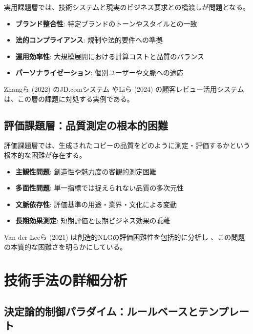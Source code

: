 \documentclass[11pt, a4paper]{article}
\begin{document}
実用課題層では、技術システムと現実のビジネス要求との橋渡しが問題となる。

\begin{itemize}[noitemsep,topsep=0pt]
    \item \textbf{ブランド整合性}: 特定ブランドのトーンやスタイルとの一致
    \item \textbf{法的コンプライアンス}: 規制や法的要件への準拠
    \item \textbf{運用効率性}: 大規模展開における計算コストと品質のバランス
    \item \textbf{パーソナライゼーション}: 個別ユーザーや文脈への適応
\end{itemize}

Zhangら (2022) のJD.comシステム \cite{ZhangEtAl2022AutomaticProduct} やLiら (2024) の顧客レビュー活用システム \cite{LiEtAl2024GeneratingAttractive} は、この層の課題に対処する実例である。

\subsection{評価課題層：品質測定の根本的困難}

評価課題層では、生成されたコピーの品質をどのように測定・評価するかという根本的な困難が存在する。

\begin{itemize}[noitemsep,topsep=0pt]
    \item \textbf{主観性問題}: 創造性や魅力度の客観的測定困難
    \item \textbf{多面性問題}: 単一指標では捉えられない品質の多次元性
    \item \textbf{文脈依存性}: 評価基準の用途・業界・文化による変動
    \item \textbf{長期効果測定}: 短期評価と長期ビジネス効果の乖離
\end{itemize}

Van der Leeら (2021) は創造的NLGの評価困難性を包括的に分析し \cite{VanDerLeeEtAl2021HumanEvaluation}、この問題の本質的な困難さを明らかにしている。

\section{技術手法の詳細分析}

\subsection{決定論的制御パラダイム：ルールベースとテンプレート}
\end{document}
